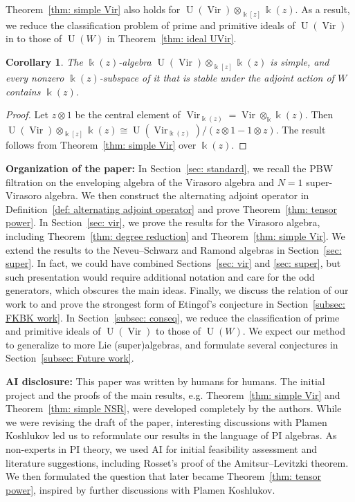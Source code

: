 \documentclass[12pt]{amsart}
\theoremstyle{plain}
\newtheorem{corollary}[theorem]{Corollary}
\theoremstyle{definition}
\numberwithin{equation}{theorem}
\newcommand{\kk}{\Bbbk}
\newcommand{\Vir}{\operatorname{Vir}}
\newcommand{\UU}{\operatorname{U}}
\begin{document}
Theorem~\ref{thm: simple Vir} also holds for $\UU(\Vir) \otimes_{\kk[z]} \kk(z)$. As a result, we reduce the classification problem of prime and primitive ideals of $\UU(\Vir)$ in \cite{pham2025orbit} to those of $\UU(W)$ in Theorem~\ref{thm: ideal UVir}.
\begin{corollary}\label{cor: simplicity Vir tensor}
    The $\kk(z)$-algebra $\UU(\Vir) \otimes_{\kk[z]} \kk(z)$ is simple, and every nonzero $\kk(z)$-subspace of it that is stable under the adjoint action of $W$ contains $\kk(z)$.
\end{corollary}
\begin{proof}
    Let $z \otimes 1$ be the central element of $\Vir_{\kk(z)} = \Vir \otimes_\kk \kk(z)$. Then $\UU(\Vir) \otimes_{\kk[z]} \kk(z) \cong \UU(\Vir_{\kk(z)})/(z \otimes 1 - 1\otimes z)$. The result follows from Theorem~\ref{thm: simple Vir} over $\kk(z)$.
\end{proof}


\textbf{Organization of the paper:} In Section~\ref{sec: standard}, we recall the PBW filtration on the enveloping algebra of the Virasoro algebra and $N=1$ super-Virasoro algebra. We then construct the alternating adjoint operator in Definition~\ref{def: alternating adjoint operator} and prove Theorem~\ref{thm: tensor power}. In Section~\ref{sec: vir}, we prove the results for the Virasoro algebra, including Theorem~\ref{thm: degree reduction} and Theorem~\ref{thm: simple Vir}. We extend the results to the Neveu--Schwarz and Ramond algebras in Section~\ref{sec: super}. In fact, we could have combined Sections~\ref{sec: vir} and \ref{sec: super}, but such presentation would require additional notation and care for the odd generators, which obscures the main ideas. Finally, we discuss the relation of our work to \cite{FeiginKanelKhoroshkin} and prove the strongest form of Etingof's conjecture in Section~\ref{subsec: FKBK work}. In Section~\ref{subsec: conseq}, we reduce the classification of prime and primitive ideals of $\UU(\Vir)$ to those of $\UU(W)$. We expect our method to generalize to more Lie (super)algebras, and formulate several conjectures in Section~\ref{subsec: Future work}.

\textbf{AI disclosure:} This paper was written by humans for humans. The initial project and the proofs of the main results, e.g. Theorem~\ref{thm: simple Vir} and Theorem~\ref{thm: simple NSR}, were developed completely by the authors. While we were revising the draft of the paper, interesting discussions with Plamen Koshlukov led us to reformulate our results in the language of PI algebras. As non-experts in PI theory, we used AI for initial feasibility assessment and literature suggestions, including Rosset's proof of the Amitsur--Levitzki theorem. We then formulated the question that later became Theorem~\ref{thm: tensor power}, inspired by further discussions with Plamen Koshlukov.
\end{document}
